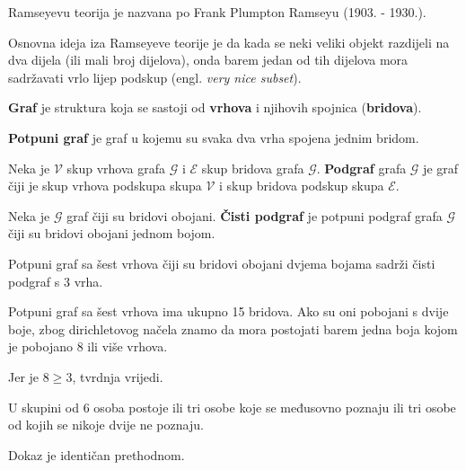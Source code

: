 Ramseyevu teorija je nazvana po Frank Plumpton Ramseyu (1903. - 1930.).

Osnovna ideja iza Ramseyeve teorije je da kada se neki veliki objekt razdijeli
na dva dijela (ili mali broj dijelova), onda barem jedan od tih dijelova mora
sadržavati vrlo lijep podskup (engl. \textit{very nice subset}).

\begin{definition}[graf]
    \textbf{Graf} je struktura koja se sastoji od \textbf{vrhova} i njihovih
    spojnica (\textbf{bridova}).
\end{definition}

\begin{definition}
    \textbf{Potpuni graf} je graf u kojemu su svaka dva vrha spojena jednim
    bridom.
\end{definition}

\begin{definition}[podgraf]
    Neka je $\mathcal{V}$ skup vrhova grafa $\mathcal{G}$ i $\mathcal{E}$ skup
    bridova grafa $\mathcal{G}$. \textbf{Podgraf} grafa $\mathcal{G}$ je graf
    čiji je skup vrhova podskupa skupa $\mathcal{V}$ i skup bridova podskup
    skupa $\mathcal{E}$.
\end{definition}

\begin{definition}
    Neka je $\mathcal{G}$ graf čiji su bridovi obojani. \textbf{Čisti podgraf}
    je potpuni podgraf grafa $\mathcal{G}$ čiji su bridovi obojani jednom bojom.
\end{definition}

\begin{example}
    Potpuni graf sa šest vrhova čiji su bridovi obojani dvjema bojama sadrži
    čisti podgraf s 3 vrha.
\end{example}

Potpuni graf sa šest vrhova ima ukupno 15 bridova. Ako su oni pobojani s dvije
boje, zbog dirichletovog načela znamo da mora postojati barem jedna boja kojom
je pobojano 8 ili više vrhova.

Jer je $8 \geq 3$, tvrdnja vrijedi.

\begin{example}
    U skupini od 6 osoba postoje ili tri osobe koje se međusovno poznaju ili tri
    osobe od kojih se nikoje dvije ne poznaju.
\end{example}

Dokaz je identičan prethodnom.
